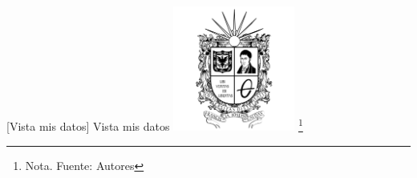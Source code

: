 {    \vspace{2mm}
    \begin{minipage}{0.9\textwidth}
    \centering
    [{Vista mis datos}]{ Vista mis datos }
    \label{prot8}
    \includegraphics[width=0.3\textwidth]{Content/Images/Escudo_UD.png}
    \footnote{Nota. \textup{Fuente: Autores}}
    \end{minipage}


    
    
    

}